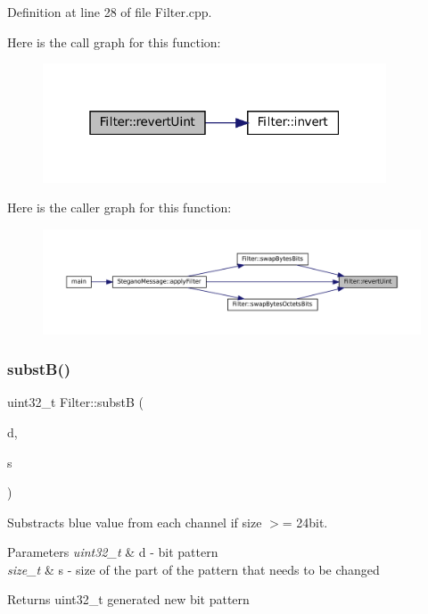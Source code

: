 Definition at line 28 of file Filter.\+cpp.

Here is the call graph for this function\+:\nopagebreak
\begin{figure}[H]
\begin{center}
\leavevmode
\includegraphics[width=289pt]{classFilter_ae4a4b081886014742d083d9a2b285981_cgraph}
\end{center}
\end{figure}
Here is the caller graph for this function\+:\nopagebreak
\begin{figure}[H]
\begin{center}
\leavevmode
\includegraphics[width=350pt]{classFilter_ae4a4b081886014742d083d9a2b285981_icgraph}
\end{center}
\end{figure}
\mbox{\label{classFilter_a3f2bbadc0138195cebf84bd8ce8d9892}} 
\subsubsection{\texorpdfstring{substB()}{substB()}}
{\footnotesize\ttfamily uint32\+\_\+t Filter\+::substB (\begin{DoxyParamCaption}\item[{uint32\+\_\+t}]{d,  }\item[{size\+\_\+t}]{s }\end{DoxyParamCaption})\hspace{0.3cm}{\ttfamily [static]}}



Substracts blue value from each channel if size $>$= 24bit. 


\begin{DoxyParams}{Parameters}
{\em uint32\+\_\+t} & d -\/ bit pattern \\
\hline
{\em size\+\_\+t} & s -\/ size of the part of the pattern that needs to be changed \\
\hline
\end{DoxyParams}
\begin{DoxyReturn}{Returns}
uint32\+\_\+t generated new bit pattern 
\end{DoxyReturn}


